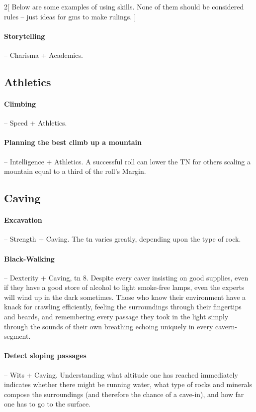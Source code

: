 \begin{multicols}{2}[
  Below are some examples of using skills.
  None of them should be considered rules -- just ideas for \glspl{gm} to make rulings.
]
\paragraph{Storytelling} -- Charisma + Academics.

\subsection{Athletics}

\paragraph{Climbing} -- Speed + Athletics.

\paragraph{Planning the best climb up a mountain} -- Intelligence + Athletics.
A successful roll can lower the TN for others scaling a mountain equal to a third of the roll's Margin.

\subsection{Caving}

\paragraph{Excavation} -- Strength + Caving.
The \gls{tn} varies greatly, depending upon the type of rock.

\paragraph{Black-Walking} -- Dexterity + Caving, \gls{tn} 8.
Despite every caver insisting on good supplies, even if they have a good store of alcohol to light smoke-free lamps, even the experts will wind up in the dark sometimes.
Those who know their environment have a knack for crawling efficiently, feeling the surroundings through their fingertips and beards, and remembering every passage they took in the light simply through the sounds of their own breathing echoing uniquely in every cavern-segment.

\paragraph{Detect sloping passages} -- Wits + Caving.
Understanding what altitude one has reached immediately indicates whether there might be running water, what type of rocks and minerals compose the surroundings (and therefore the chance of a cave-in), and how far one has to go to the surface.


\end{multicols}
